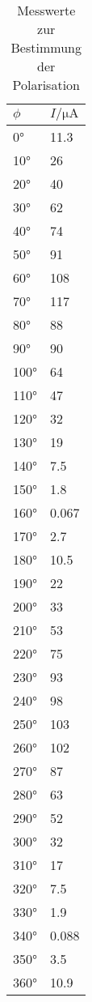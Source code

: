 \newpage
\begin{table}[H]
  \centering
  \caption{Messwerte zur Bestimmung der Polarisation}
  \label{tab:tabe5}
    \begin{tabular}{l l}
    \toprule
    $ \phi $ & $ I / \si{\micro\ampere} $ \\
    \midrule
    0° & 11.3 \\
    10° & 26 \\
    20° & 40 \\
    30° & 62 \\
    40° & 74 \\
    50° & 91 \\
    60° & 108 \\
    70° & 117 \\
    80° & 88 \\
    90° & 90 \\
    100° & 64 \\
    110° & 47 \\
    120° & 32 \\
    130° & 19 \\
    140° & 7.5 \\
    150° & 1.8 \\
    160° & 0.067 \\
    170° & 2.7 \\
    180° & 10.5 \\
    190° & 22 \\
    200° & 33 \\
    210° & 53 \\
    220° & 75 \\
    230° & 93 \\
    240° & 98 \\
    250° & 103 \\
    260° & 102 \\
    270° & 87 \\
    280° & 63 \\
    290° & 52 \\
    300° & 32 \\
    310° & 17 \\
    320° & 7.5 \\
    330° & 1.9 \\
    340° & 0.088 \\
    350° & 3.5 \\
    360° & 10.9 \\



          \bottomrule
        \end{tabular}
    \end{table}
